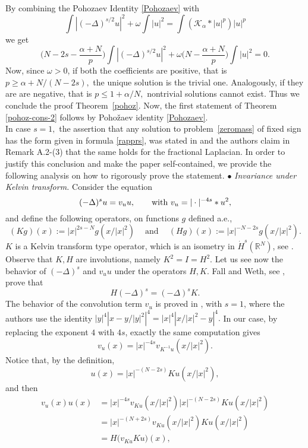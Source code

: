 \documentclass[10pt]{amsart}
\numberwithin{equation}{section}
\begin{document}
\noindent By combining the Pohozaev Identity \eqref{Pohozaev} with
\[
\int |(-\Delta)^{s/2} u|^2 + \omega \int|u|^2 = \int {{(\mathcal K_{\alpha}*|u|^{p})}} |u|^{p}
\]
we get
\begin{equation*}
\Big(N-2s-\frac{\alpha+N}{p}\Big)\int |(-\Delta)^{s/2} u|^2
+\omega\Big(N-\frac{\alpha+N}{p}\Big)\int |u|^2=0.
\end{equation*}
Now, since $\omega>0$, if both the coefficients 
are positive, that is 
$
p\geq \alpha+N/(N-2s),
$
the unique solution is the trivial one. Analogously, if they are
are negative, that is
$
p\leq 1+\alpha/N,
$
nontrivial solutions cannot exist.
Thus we conclude the proof Theorem~\ref{pohoz}.  Now, the first statement of Theorem  \ref{pohoz-cons-2}
follows by Poho\v zaev identity \eqref{Pohozaev}.  \\
In case $s=1,$ the assertion that 
any solution to problem~\eqref{zeromass} of fixed sign has the 
form given in formula \eqref{rapprs},  was  stated 
in \cite[Proposition A.1]{Ingoroneta} and the authors claim in  Remark A.2-(3)
that the same holds for the fractional Laplacian.
In order to justify this conclusion and make the paper self-contained, we provide the following analysis
on how to rigorously prove the statement. 
\vskip3pt
\noindent
$\bullet$ {\em Invariance under Kelvin transform.} Consider the equation
\begin{equation*}
(-\Delta)^{s} u =v_u u,
\qquad
\hbox{with }
v_u= |\cdot|^{-4s}*u^{2},
\end{equation*}
and define the following operators, on functions $g$ defined a.e.,
$$
(Kg)(x):=|x|^{2s-N}g(x/|x|^{2})\ \quad \text{and} \quad\ (Hg)(x):=|x|^{-N-2s}g(x/|x|^{2}).
$$
$K$ is a Kelvin transform type operator, which is an isometry in $\dot H^{s}(\mathbb R^{N})$,
see \cite[Lemma 2.2]{fallweth}.
Observe that $K,H$  are involutions, namely
$K^{2}=I=H^{2}.$
Let us see now the behavior of $(-\Delta)^{s}$ and $v_u u$ under the operators $H,K.$ 
Fall and Weth, see \cite[Corollary 2.3]{fallweth}, prove that 
$$
H(-\Delta)^{s}=(-\Delta )^{s} K.
$$
The behavior of  the convolution term $v_u$ is  proved in
\cite[Lemma A.3]{Ingoroneta}, with $s=1$, where the authors use the identity
$|y|^{4}|x-{y}/{|y|^{2}}|^{4}=|x|^{4}|{x}/{|x|^{2}}-y|^{4}.$
In our case, by replacing the  exponent $4$ with $4s$,
 exactly the same computation gives
$$
v_u (x)= |x|^{-4s} v_{K^{-1} u} (x/|x|^{2}).
$$
Notice that, by the definition, 
$$
u(x)=|x|^{-(N-2s)}Ku(x/|x|^{2}), 
$$
and then
\begin{align*}
v_u(x) u(x)
&=|x|^{-4s}  v_{Ku} (x/|x|^{2}) |x |^{-(N-2s)} Ku(x/|x|^{2})\\
&= |x|^{-(N+2s)}v_{Ku} (x/|x|^{2})  Ku(x/|x|^{2})\\
&= H\big(v_{Ku} Ku\big)(x),
\end{align*}
\end{document}
